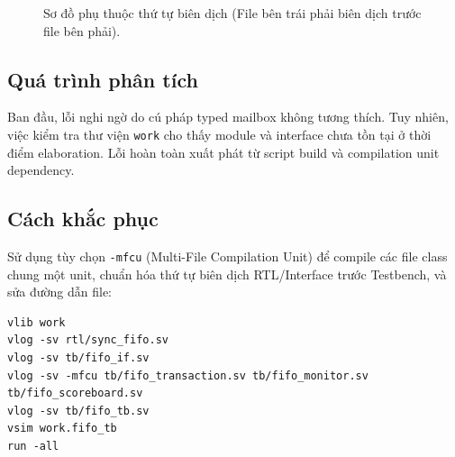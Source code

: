 \documentclass[12pt, a4paper]{article}
\begin{document}
\begin{figure}[H]
\centering
{}
\caption{Sơ đồ phụ thuộc thứ tự biên dịch (File bên trái phải biên dịch trước file bên phải).}
\label{fig:log02_c}
\end{figure}

\subsection*{Quá trình phân tích}
Ban đầu, lỗi nghi ngờ do cú pháp typed mailbox không tương thích. Tuy nhiên, việc kiểm tra thư viện \texttt{work} cho thấy module và interface chưa tồn tại ở thời điểm elaboration. Lỗi hoàn toàn xuất phát từ script build và compilation unit dependency.

\subsection*{Cách khắc phục}
Sử dụng tùy chọn \texttt{-mfcu} (Multi-File Compilation Unit) để compile các file class chung một unit, chuẩn hóa thứ tự biên dịch RTL/Interface trước Testbench, và sửa đường dẫn file:

\begin{codebox}
\begin{verbatim}
vlib work
vlog -sv rtl/sync_fifo.sv
vlog -sv tb/fifo_if.sv
vlog -sv -mfcu tb/fifo_transaction.sv tb/fifo_monitor.sv tb/fifo_scoreboard.sv
vlog -sv tb/fifo_tb.sv
vsim work.fifo_tb
run -all
\end{verbatim}
\end{codebox}
\end{document}
